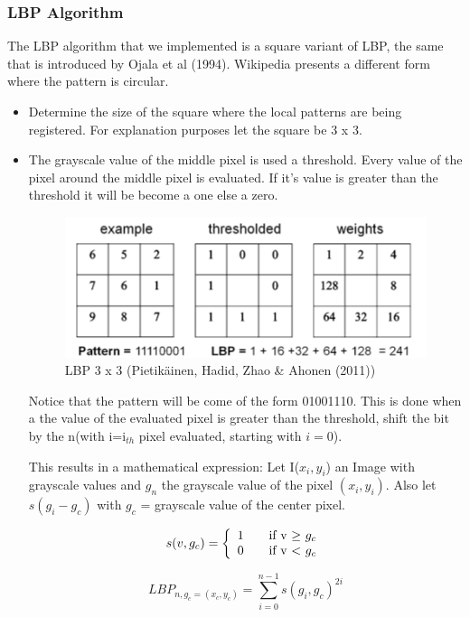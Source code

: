 \documentclass[a4paper]{article}
\begin{document}
\subsubsection{LBP Algorithm}
The LBP algorithm that we implemented is a square variant of LBP, the same
that is introduced by Ojala et al (1994). Wikipedia presents a different
form where the pattern is circular. 
\begin{itemize}
\item Determine the size of the square where the local patterns are being
registered. For explanation purposes let the square be 3 x 3. \\
\item The grayscale value of the middle pixel is used a threshold. Every value of the pixel 
around the middle pixel is evaluated. If it's value is greater than the threshold
it will be become a one else a zero.

\begin{figure}[h!]
\center
\includegraphics[scale=0.5]{lbp.png}
\caption{LBP 3 x 3 (Pietik\"ainen, Hadid, Zhao \& Ahonen (2011))}
\end{figure}

Notice that the pattern will be come of the form 01001110. This is done when a the value
of the evaluated pixel is greater than the threshold, shift the bit by the n(with i=i$_{th}$ pixel
evaluated, starting with $i=0$).

This results in a mathematical expression:
Let I($x_i, y_i$) an Image with grayscale values and $g_n$ the grayscale value of the pixel $(x_i, y_i)$. 
Also let $s(g_i - g_c)$ with $g_c$ = grayscale value of the center pixel.

$$
  s(v, g_c) = \left\{
  \begin{array}{l l}
    1 & \quad \text{if v $\geq$ $g_c$}\\
    0 & \quad \text{if v $<$ $g_c$}\\
  \end{array} \right.
$$

$$LBP_{n, g_c = (x_c, y_c)} = \sum\limits_{i=0}^{n-1} s(g_i, g_c)^{2i} $$


\end{itemize}
\end{document}
